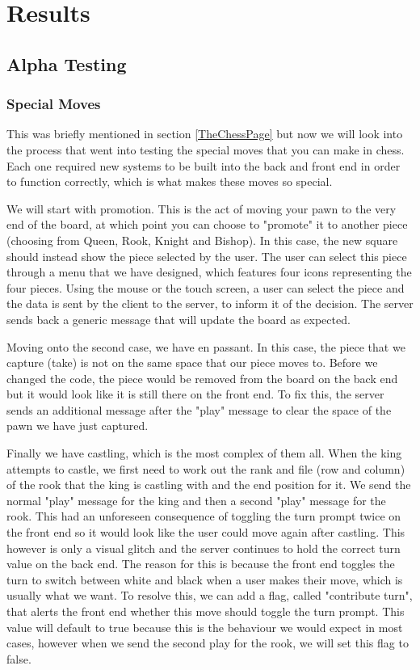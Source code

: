 \chapter{Results}
\label{chapter3}

\section{Alpha Testing}

\subsection{Special Moves}
\label{SpecialMoves}

This was briefly mentioned in section \ref{TheChessPage} but now we will look into the process that went into testing the special moves that you can make in chess. Each one required new systems to be built into the back and front end in order to function correctly, which is what makes these moves so special.

We will start with promotion. This is the act of moving your pawn to the very end of the board, at which point you can choose to "promote" it to another piece (choosing from Queen, Rook, Knight and Bishop). In this case, the new square should instead show the piece selected by the user. The user can select this piece through a menu that we have designed, which features four icons representing the four pieces. Using the mouse or the touch screen, a user can select the piece and the data is sent by the client to the server, to inform it of the decision. The server sends back a generic message that will update the board as expected.

Moving onto the second case, we have en passant. In this case, the piece that we capture (take) is not on the same space that our piece moves to. Before we changed the code, the piece would be removed from the board on the back end but it would look like it is still there on the front end. To fix this, the server sends an additional message after the "play" message to clear the space of the pawn we have just captured.

Finally we have castling, which is the most complex of them all. When the king attempts to castle, we first need to work out the rank and file (row and column) of the rook that the king is castling with and the end position for it. We send the normal "play" message for the king and then a second "play" message for the rook. This had an unforeseen consequence of toggling the turn prompt twice on the front end so it would look like the user could move again after castling. This however is only a visual glitch and the server continues to hold the correct turn value on the back end. The reason for this is because the front end toggles the turn to switch between white and black when a user makes their move, which is usually what we want. To resolve this, we can add a flag, called "contribute turn", that alerts the front end whether this move should toggle the turn prompt. This value will default to true because this is the behaviour we would expect in most cases, however when we send the second play for the rook, we will set this flag to false.

